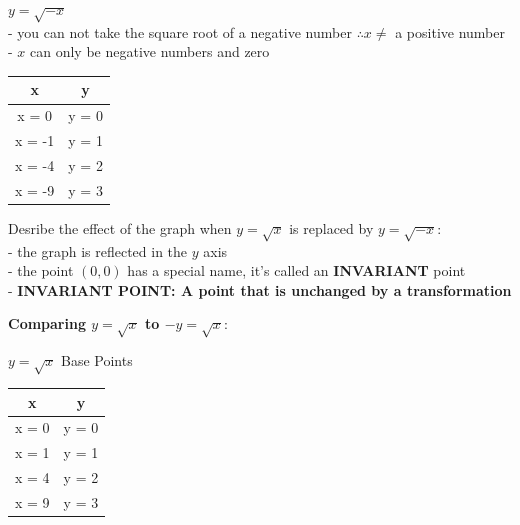 \documentclass[10pt]{article}
\begin{document}
\(y = \sqrt{-x}\) \\
- you can not take the square root of a negative number \(\therefore x \neq \) a positive number \\
- \(x\) can only be negative numbers and zero \\
\begin{tabular}{|c|c|}
    \hline
    x      & y     \\
    \hline
    x = 0  & y = 0 \\
    x = -1 & y = 1 \\
    x = -4 & y = 2 \\
    x = -9 & y = 3 \\
    \hline
\end{tabular}




Desribe the effect of the graph when \(y = \sqrt{x}\) is replaced by \(y = \sqrt{-x}\): \\
- the graph is reflected in the \(y\) axis \\
- the point \((0,0)\) has a special name, it's called an \textbf{INVARIANT} point \\
- \textbf{INVARIANT POINT: A point that is unchanged by a transformation}
\clearpage


\textbf{Comparing \(y = \sqrt{x}\) to \(-y = \sqrt{x}\)}:


\(y = \sqrt{x}\) Base Points \\
\begin{tabular}{|c|c|}
    \hline
    x     & y     \\
    \hline
    x = 0 & y = 0 \\
    x = 1 & y = 1 \\
    x = 4 & y = 2 \\
    x = 9 & y = 3 \\
    \hline
\end{tabular}
\end{document}
